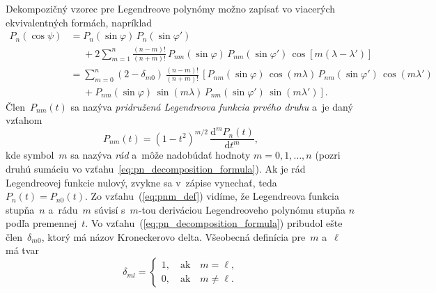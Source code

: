 \documentclass[a4paper, 12pt]{book}
\newcommand{\diff}{\mathrm d}
\begin{document}
Dekompozičný vzorec pre Legendreove polynómy možno zapísať vo viacerých
ekvivalentných formách, napríklad
\parencite{Hobson,MoritzPhysicalGeodesy,SansoGeoidDetermination}
%
\begin{equation}
\label{eq:pn_decomposition_formula}
\begin{split}
P_n(\cos\psi) &= P_n(\sin\varphi) \, P_n(\sin\varphi')\\
%
&\phantom{={}} +2 \sum_{m = 1}^{n} \frac{(n - m)!}{(n + m)!} \,
P_{nm}(\sin\varphi) \, P_{nm}(\sin\varphi') \, \cos\left[m (\lambda
- \lambda') \right]\\
%
&= \sum_{m = 0}^{n} (2 - \delta_{m0}) \, \frac{(n - m)!}{(n + m)!} \, \left[
P_{nm}(\sin\varphi) \, \cos(m\lambda) \, P_{nm}(\sin\varphi') \,
\cos(m\lambda')\right.\\
%
&\phantom{={}}+\left. P_{nm}(\sin\varphi) \, \sin(m\lambda) \,
P_{nm}(\sin\varphi') \, \sin(m\lambda')\right]{.}
\end{split}
\end{equation}
%
Člen~$P_{nm}(t)$ sa nazýva \emph{pridružená Legendreova funkcia prvého druhu}
a~je daný vzťahom
%
\begin{equation}
\label{eq:pnm_def}
P_{nm}(t) = (1 - t^2)^{m \slash 2} \, \frac{\diff^m P_n(t)}{\diff t^m}{,}
\end{equation}
%
kde symbol~$m$ sa nazýva \emph{rád} a~môže nadobúdať hodnoty $m = 0, 1, \dots, 
n$ (pozri druhú sumáciu vo vzťahu~\ref{eq:pn_decomposition_formula}).  Ak je 
rád Legendreovej funkcie nulový, zvykne sa v~zápise vynechať, teda $P_n(t) 
= P_{n0}(t)$.  Zo vzťahu~(\ref{eq:pnm_def}) vidíme, že Legendreova funkcia 
stupňa~$n$ a~rádu~$m$ súvisí s~$m$-tou deriváciou Legendreoveho polynómu stupňa 
$n$ podľa premennej~$t$.  Vo vzťahu~(\ref{eq:pn_decomposition_formula}) 
pribudol ešte člen~$\delta_{m0}$, ktorý má názov Kroneckerovo delta.  Všeobecná 
definícia pre~$m$ a~$\ell$ má tvar
%
\begin{equation}
\delta_{ml} =
%
\begin{cases}
1{,} \quad \mathrm{ak} \quad m = \ell{,}\\
0{,} \quad \mathrm{ak} \quad m \neq \ell{.}
\end{cases}
\end{equation}
\end{document}
